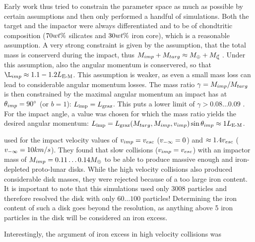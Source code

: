 Early work \citep{Benz:1985p1755, Benz:1989p1893, Cameron:2000p1854} thus tried to constrain the parameter space as much as possible by certain assumptions and then only performed a handful of simulations. Both the target and the impactor were always differentiated and to be of chondtritic composition ($70 wt\mathrm{\%}$ silicates and $30 wt\mathrm{\%}$ iron core), which is a reasonable assumption. A very strong constraint is given by the assumption, that the total mass is conserverd during the impact, thus $\Mimp + \Mtar \approx \ME + \ML$. Under this assumption, also the angular momentum is conservered, so that $\L_{imp} \approx 1.1 - 1.2 \lem$. This assumption is weaker, as even a small mass loss can lead to considerable angular momentum losses. The mass ratio $\gamma = M_{imp} / M_{targ}$ is then constrained by the maximal angular momentum an impact has at $\theta_{imp} = 90 ^\circ$ (or $b = 1$): $L_{\textrm{imp}} = L_{\textrm{graz}}$. This puts a lower limit of $\gamma > 0.08 \dots 0.09$ \citep{Canup:2001p1861}. For the impact angle, a value was chosen for which the mass ratio yields the desired angular momentum: $L_{\textrm{imp}} = L_{\textrm{graz}} (M_{targ}, M_{imp}, v_{imp}) \sin{\theta_{imp}} \approx 1 L_{\textrm{E-M}}$. 


\cite{Benz:1989p1893} used for the impact velocity values of $v_{imp} = v_{esc}$ ($v_{-\infty} = 0$) and $\approx 1.4 v_{esc}$ ($v_{-\infty} = 10km/s$). They found that slow collisions ($v_{imp} = v_{esc}$) with an impactor mass of $M_{imp} = 0.11 \dots 0.14 M_{\oplus}$ to be able to produce massive enough and iron-depleted proto-lunar disks. While the high velocity collisions also produced considerable disk masses, they were rejected because of a too large iron content. It is important to note that this simulations used only $3008$ particles and therefore resolved the disk with only $60 \dots 100$ particles! Determining the iron content of such a disk goes beyond the resolution, as anything above 5 iron particles in the disk will be considered an iron excess. 


Interestingly, the argument of iron excess in high velocity collisions was 

\cite{Cameron:2000p1854}











